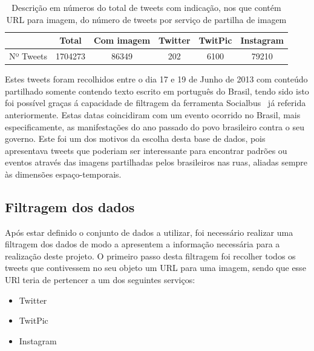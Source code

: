 \vspace{5 mm}
\begin{table}[h]
\centering
\begin{tabular}{|l|c|c|l|l|l|}
\hline
          & Total                        & Com imagem & Twitter                  & TwitPic                   & Instagram                  \\ \hline
Nº Tweets & \multicolumn{1}{r|}{1704273} & 86349      & \multicolumn{1}{c|}{202} & \multicolumn{1}{c|}{6100} & \multicolumn{1}{c|}{79210} \\ \hline
\end{tabular}
\caption{Descrição em números do total de tweets com indicação, nos que contém URL para imagem, do número de tweets por serviço de partilha de imagem}
\label{tab:nbrtweets}
\end{table}
\vspace{5 mm}

Estes tweets foram recolhidos entre o dia 17 e 19 de Junho de 2013 com conteúdo partilhado somente contendo texto escrito em português do Brasil, tendo sido isto foi possível graças á capacidade de filtragem da ferramenta Socialbus~\cite{Boanjak2012} já referida anteriormente. Estas datas coincidiram com um evento ocorrido no Brasil, mais especificamente, as manifestações do ano passado do povo brasileiro contra o seu governo. Este foi um dos motivos da escolha desta base de dados, pois apresentava tweets que poderiam ser interessante para encontrar padrões ou eventos através das imagens partilhadas pelos brasileiros nas ruas, aliadas sempre às dimensões espaço-temporais. 

\subsection{Filtragem dos dados}

Após estar definido o conjunto de dados a utilizar, foi necessário realizar uma filtragem dos dados de modo a apresentem a informação necessária para a realização deste projeto. O primeiro passo desta filtragem foi recolher todos os tweets que contivessem no seu objeto um URL para uma imagem, sendo que esse URl teria de pertencer a um dos seguintes serviços: 

\begin{itemize}
\item Twitter
\item TwitPic
\item Instagram
\end{itemize}

